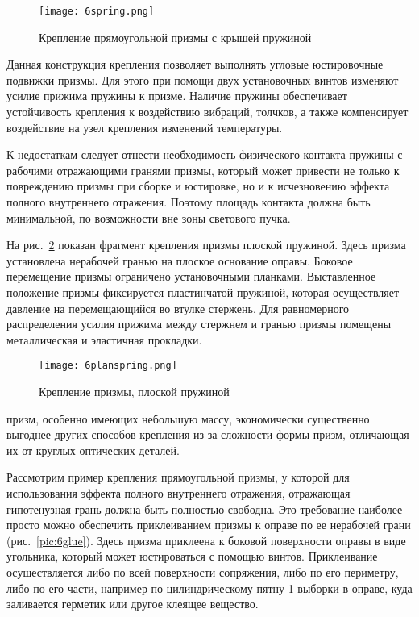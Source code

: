 \begin{figure}[h!]
	\begin{center}
		\texttt{[image: 6spring.png]}
		\caption{ Крепление прямоугольной призмы с крышей пружиной }
		\label{pic:6spring}
	\end{center}
\end{figure}

Данная конструкция крепления позволяет выполнять угловые юстировочные подвижки призмы. Для этого при помощи двух установочных винтов изменяют усилие прижима пружины к призме. Наличие пружины обеспечивает устойчивость крепления к воздействию вибраций, толчков, а также компенсирует воздействие на узел крепления изменений температуры.

К недостаткам следует отнести необходимость физического контакта пружины с рабочими отражающими гранями призмы, который может привести не только к повреждению призмы при сборке и юстировке, но и к исчезновению эффекта полного внутреннего отражения. Поэтому площадь контакта должна быть минимальной, по возможности вне зоны светового пучка.

На рис.~\ref{pic:6planspring} показан фрагмент крепления призмы плоской пружиной. Здесь призма установлена нерабочей гранью на плоское основание оправы. Боковое перемещение призмы ограничено установочными планками. Выставленное положение призмы фиксируется пластинчатой пружиной, которая осуществляет давление на перемещающийся во втулке стержень. Для равномерного распределения усилия прижима между стержнем и гранью призмы помещены металлическая и эластичная прокладки.

\begin{figure}[h!]
	\begin{center}
		\texttt{[image: 6planspring.png]}
		\caption{ Крепление призмы, плоской пружиной }
		\label{pic:6planspring}
	\end{center}
\end{figure} 

  призм, особенно имеющих небольшую массу, экономически существенно выгоднее других способов крепления из-за сложности формы призм, отличающая их от круглых оптических деталей.

Рассмотрим пример крепления прямоугольной призмы, у которой для использования эффекта полного внутреннего отражения, отражающая гипотенузная грань должна быть полностью свободна. 
Это требование наиболее просто можно обеспечить приклеиванием призмы к оправе по ее нерабочей грани (рис.~\ref{pic:6glue}). 
Здесь призма приклеена к боковой поверхности оправы в виде угольника, который может юстироваться с помощью винтов. 
Приклеивание осуществляется либо по всей поверхности сопряжения, либо по его периметру, либо по его части, например по цилиндрическому пятну 1 выборки в оправе, куда заливается герметик или другое клеящее вещество.

